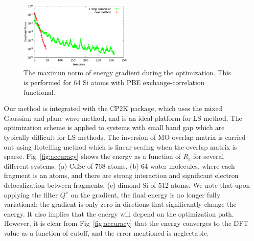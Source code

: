 \documentclass[aps,prl,twocolumn,reprint,amsmath,amssymb]{revtex4-1}
\begin{document}



\begin{figure}
\includegraphics[width=0.5\textwidth]{convergence}
\caption{The maximun norm of energy gradient during the optimization. This is performed for 64 Si atoms with PBE exchange-correlation functional.}
\label{fig:convergence}
\end{figure}

\label{marker:results}
Our method is integrated with the CP2K package\cite{cp2kgeneral}, which uses the mixed Gaussian and plane wave method\cite{vandevondele2005quickstep}, and is an ideal platform for LS method. The optimization scheme is applied to systems with small band gap which are typically difficult for LS methods. The inversion of MO overlap matrix is carried out using Hotelling method \cite{hotelling1943some} which is linear scaling when the overlap matrix is sparse. Fig~\ref{fig:accuracy} shows the energy as a function of $R_c$ for several different systems: (a) CdSe of 768 atoms. (b) 64 water molecules, where each fragment is an atoms, and there are strong interaction and significant electron delocalization between fragments. (c) dimond Si of 512 atoms. We note that upon applying the filter $Q^x$ on the gradient, the final energy is no longer fully variational: the gradient is only zero in diretions that significantly change the energy. It also implies that the energy will depend on the optimization path. However, it is clear from Fig~\ref{fig:accuracy} that the energy converges to the DFT value as a function of cutoff, and the error mentioned is neglectable. 
\end{document}
